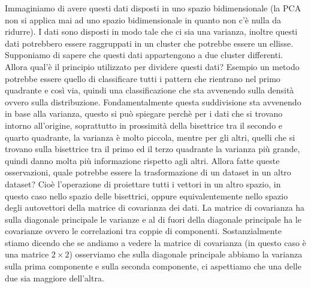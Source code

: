 Immaginiamo di avere questi dati disposti in uno spazio bidimensionale (la PCA non si applica mai ad uno spazio bidimensionale in quanto non c'è nulla da ridurre). I dati sono disposti in modo tale che ci sia una varianza, inoltre questi dati potrebbero essere raggruppati in un cluster che potrebbe essere un ellisse. Supponiamo di sapere che questi dati appartengono a due cluster differenti. Allora qual'è il principio utilizzato per dividere questi dati? Esempio un metodo potrebbe essere quello di classificare tutti i pattern che rientrano nel primo quadrante e così via, quindi una classificazione che sta avvenendo sulla densità ovvero sulla distribuzione. Fondamentalmente questa suddivisione sta avvenendo in base alla varianza, questo si può spiegare perchè per i dati che si trovano intorno all'origine, soprattutto in prossimità della bisettrice tra il secondo e quarto quadrante, la varianza è molto piccola, mentre per gli altri, quelli che si trovano sulla bisettrice tra il primo ed il terzo quadrante la varianza più grande, quindi danno molta più informazione rispetto agli altri. Allora fatte queste osservazioni, quale potrebbe essere la trasformazione di un dataset in un altro dataset? Cioè l'operazione di proiettare tutti i vettori in un altro spazio, in questo caso nello spazio delle bisettrici, oppure equivalentemente nello spazio degli autovettori della matrice di covarianza dei dati. La matrice di covarianza ha sulla diagonale principale le varianze e al di fuori della diagonale principale ha le covarianze ovvero le correlazioni tra coppie di componenti. Sostanzialmente stiamo dicendo che se andiamo a vedere la matrice di covarianza (in questo caso è una matrice $2\times2$) osserviamo che sulla diagonale principale abbiamo la varianza sulla prima componente e sulla seconda componente, ci aspettiamo che una delle due sia maggiore dell'altra. 
